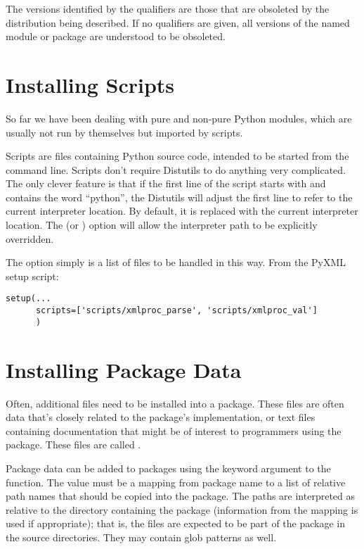 \documentclass{manual}
\begin{document}
The versions identified by the qualifiers are those that are obsoleted
by the distribution being described.  If no qualifiers are given, all
versions of the named module or package are understood to be
obsoleted.


\section{Installing Scripts}

So far we have been dealing with pure and non-pure Python modules,
which are usually not run by themselves but imported by scripts.

Scripts are files containing Python source code, intended to be
started from the command line.  Scripts don't require Distutils to do
anything very complicated.  The only clever feature is that if the
first line of the script starts with \code{\#!} and contains the word
``python'', the Distutils will adjust the first line to refer to the
current interpreter location. By default, it is replaced with the
current interpreter location.  The  (or
) option will allow the interpreter path to be
explicitly overridden.

The  option simply is a list of files to be handled
in this way.  From the PyXML setup script:

\begin{verbatim}
setup(... 
      scripts=['scripts/xmlproc_parse', 'scripts/xmlproc_val']
      )
\end{verbatim}


\section{Installing Package Data}

Often, additional files need to be installed into a package.  These
files are often data that's closely related to the package's
implementation, or text files containing documentation that might be
of interest to programmers using the package.  These files are called
.

Package data can be added to packages using the 
keyword argument to the  function.  The value must
be a mapping from package name to a list of relative path names that
should be copied into the package.  The paths are interpreted as
relative to the directory containing the package (information from the
 mapping is used if appropriate); that is, the files
are expected to be part of the package in the source directories.
They may contain glob patterns as well.
\end{document}
